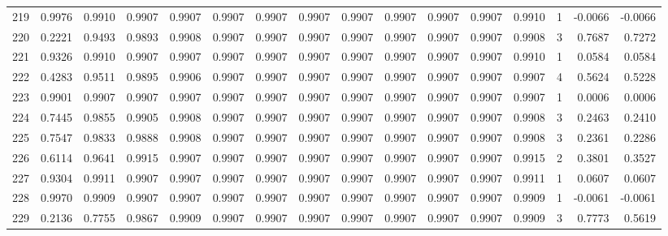 \begin{tabular}{lrrrrrrrrrrrrrrr}
219 &      0.9976 &  0.9910 &  0.9907 &  0.9907 &  0.9907 &  0.9907 &  0.9907 &  0.9907 &  0.9907 &  0.9907 &   0.9907 &     0.9910 &      1 &                   -0.0066 &                    -0.0066 \\
220 &      0.2221 &  0.9493 &  0.9893 &  0.9908 &  0.9907 &  0.9907 &  0.9907 &  0.9907 &  0.9907 &  0.9907 &   0.9907 &     0.9908 &      3 &                    0.7687 &                     0.7272 \\
221 &      0.9326 &  0.9910 &  0.9907 &  0.9907 &  0.9907 &  0.9907 &  0.9907 &  0.9907 &  0.9907 &  0.9907 &   0.9907 &     0.9910 &      1 &                    0.0584 &                     0.0584 \\
222 &      0.4283 &  0.9511 &  0.9895 &  0.9906 &  0.9907 &  0.9907 &  0.9907 &  0.9907 &  0.9907 &  0.9907 &   0.9907 &     0.9907 &      4 &                    0.5624 &                     0.5228 \\
223 &      0.9901 &  0.9907 &  0.9907 &  0.9907 &  0.9907 &  0.9907 &  0.9907 &  0.9907 &  0.9907 &  0.9907 &   0.9907 &     0.9907 &      1 &                    0.0006 &                     0.0006 \\
224 &      0.7445 &  0.9855 &  0.9905 &  0.9908 &  0.9907 &  0.9907 &  0.9907 &  0.9907 &  0.9907 &  0.9907 &   0.9907 &     0.9908 &      3 &                    0.2463 &                     0.2410 \\
225 &      0.7547 &  0.9833 &  0.9888 &  0.9908 &  0.9907 &  0.9907 &  0.9907 &  0.9907 &  0.9907 &  0.9907 &   0.9907 &     0.9908 &      3 &                    0.2361 &                     0.2286 \\
226 &      0.6114 &  0.9641 &  0.9915 &  0.9907 &  0.9907 &  0.9907 &  0.9907 &  0.9907 &  0.9907 &  0.9907 &   0.9907 &     0.9915 &      2 &                    0.3801 &                     0.3527 \\
227 &      0.9304 &  0.9911 &  0.9907 &  0.9907 &  0.9907 &  0.9907 &  0.9907 &  0.9907 &  0.9907 &  0.9907 &   0.9907 &     0.9911 &      1 &                    0.0607 &                     0.0607 \\
228 &      0.9970 &  0.9909 &  0.9907 &  0.9907 &  0.9907 &  0.9907 &  0.9907 &  0.9907 &  0.9907 &  0.9907 &   0.9907 &     0.9909 &      1 &                   -0.0061 &                    -0.0061 \\
229 &      0.2136 &  0.7755 &  0.9867 &  0.9909 &  0.9907 &  0.9907 &  0.9907 &  0.9907 &  0.9907 &  0.9907 &   0.9907 &     0.9909 &      3 &                    0.7773 &                     0.5619 \\

\end{tabular}
